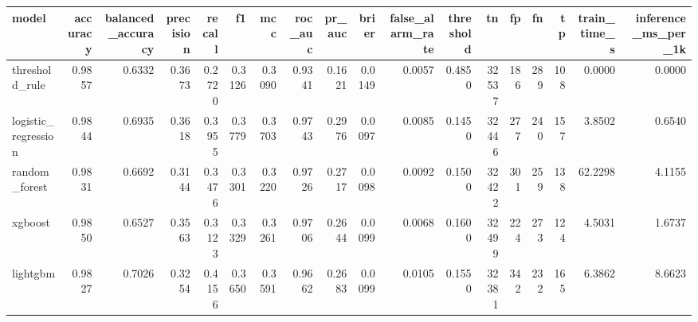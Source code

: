 \begin{tabular}{lrrrrrrrrrrrrrrrrr}
\toprule
model & accuracy & balanced\_accuracy & precision & recall & f1 & mcc & roc\_auc & pr\_auc & brier & false\_alarm\_rate & threshold & tn & fp & fn & tp & train\_time\_s & inference\_ms\_per\_1k \\
\midrule
threshold\_rule & 0.9857 & 0.6332 & 0.3673 & 0.2720 & 0.3126 & 0.3090 & 0.9341 & 0.1621 & 0.0149 & 0.0057 & 0.4850 & 32537 & 186 & 289 & 108 & 0.0000 & 0.0000 \\
logistic\_regression & 0.9844 & 0.6935 & 0.3618 & 0.3955 & 0.3779 & 0.3703 & 0.9743 & 0.2976 & 0.0097 & 0.0085 & 0.1450 & 32446 & 277 & 240 & 157 & 3.8502 & 0.6540 \\
random\_forest & 0.9831 & 0.6692 & 0.3144 & 0.3476 & 0.3301 & 0.3220 & 0.9726 & 0.2717 & 0.0098 & 0.0092 & 0.1500 & 32422 & 301 & 259 & 138 & 62.2298 & 4.1155 \\
xgboost & 0.9850 & 0.6527 & 0.3563 & 0.3123 & 0.3329 & 0.3261 & 0.9706 & 0.2644 & 0.0099 & 0.0068 & 0.1600 & 32499 & 224 & 273 & 124 & 4.5031 & 1.6737 \\
lightgbm & 0.9827 & 0.7026 & 0.3254 & 0.4156 & 0.3650 & 0.3591 & 0.9662 & 0.2683 & 0.0099 & 0.0105 & 0.1550 & 32381 & 342 & 232 & 165 & 6.3862 & 8.6623 \\
\bottomrule
\end{tabular}
